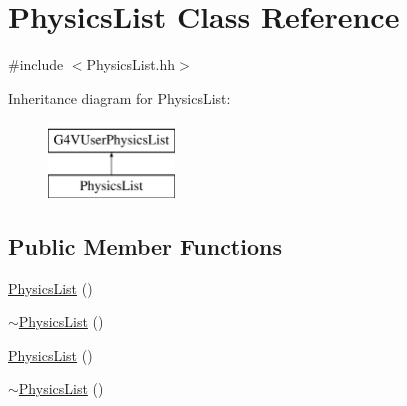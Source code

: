 \hypertarget{class_physics_list}{\section{Physics\-List Class Reference}
\label{class_physics_list}
}


{\ttfamily \#include $<$Physics\-List.\-hh$>$}

Inheritance diagram for Physics\-List\-:\begin{figure}[H]
\begin{center}
\leavevmode
\includegraphics[height=2.000000cm]{class_physics_list}
\end{center}
\end{figure}
\subsection*{Public Member Functions}
\begin{DoxyCompactItemize}
\item 
\hyperlink{class_physics_list_aeecf835245a0b10c24e5e6c37cbb0dab}{Physics\-List} ()
\item 
\hyperlink{class_physics_list_a6cff761e006f8d5c57f0beca0e7d61ae}{$\sim$\-Physics\-List} ()
\item 
\hyperlink{class_physics_list_aeecf835245a0b10c24e5e6c37cbb0dab}{Physics\-List} ()
\item 
\hyperlink{class_physics_list_a6cff761e006f8d5c57f0beca0e7d61ae}{$\sim$\-Physics\-List} ()
\end{DoxyCompactItemize}
